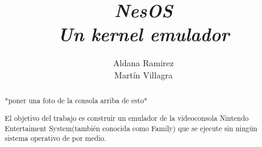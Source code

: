 \documentclass[a4paper,12pt,spanish,notitlepage]{report}
\def\name{\textsl{NesOS}}
\begin{document}
\title{\name\\\large\textit{Un kernel emulador}}
\author{Aldana Ramirez\\Martín Villagra}
\maketitle
\vspace{\fill}
\begin{abstract}\centering

*poner una foto de la consola arriba de esto*


El objetivo del trabajo es construir un emulador de la videoconsola Nintendo Entertaiment System(también conocida como Family) que se ejecute sin ningún sistema operativo de por medio.
\end{abstract}
\tableofcontents



\end{document}
